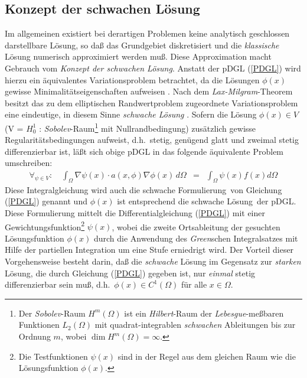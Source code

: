 \subsection{Konzept der schwachen Lösung}
\label{schwacheloesung}

Im allgemeinen existiert bei derartigen Problemen keine analytisch
geschlossen darstellbare Lösung, so daß das Grundgebiet diskretisiert
und die {\em klassische} Lösung numerisch approximiert werden muß. Diese
Approximation macht Gebrauch vom {\em Konzept der schwachen Lösung}.
Anstatt der pDGL (\ref{PDGL}) wird hierzu ein äquivalentes Variationsproblem
betrachtet, da die Lösungen $\phi(x)$ gewisse Minimalitätseigenschaften
aufweisen \cite{Bat82, Zie84}. Nach dem {\sl Lax-Milgram}-Theorem besitzt
das zu dem elliptischen Randwertproblem zugeordnete Variationsproblem eine
eindeutige, in diesem Sinne {\em schwache Lösung} \cite{Bra91}.
Sofern die Lösung
$\phi(x) \in V$ (V = $H_{0}^{1}$ : {\sl Sobolev}-Raum\footnote{Der
{\sl Sobolev}-Raum $H^{m}(\Omega)$ ist ein {\sl Hilbert}-Raum der
{\sl Lebesgue}-meßbaren Funktionen $L_{2}(\Omega)$ mit quadrat-integrablen
{\em schwachen} Ableitungen bis zur Ordnung $m$, wobei
$\dim H^{m}(\Omega) = \infty$.} mit Nullrandbedingung)
zusätzlich gewisse Regularitätsbedingungen
aufweist, d.h.\ stetig, genügend glatt und zweimal stetig differenzierbar
ist,    %
läßt sich obige pDGL in das folgende äquivalente Problem umschreiben:
\begin{eqnarray}
\label{schwach}
  \forall_{\psi \in V}: \quad \int_{\Omega} \nabla\psi(x) \cdot a(x,\phi)
  \nabla \phi(x) \, d\Omega & = & \int_{\Omega} \psi(x) f(x) d\Omega
\end{eqnarray}
Diese Integralgleichung wird auch die \glqq schwache Formulierung\grqq \,
von Gleichung (\ref{PDGL}) genannt und $\phi(x)$ ist entsprechend die
\glqq schwache Lösung\grqq \, der pDGL. Diese Formulierung mittelt die
Differentialgleichung (\ref{PDGL}) mit einer Gewichtungsfunktion\footnote{Die
Testfunktionen $\psi(x)$ sind in der Regel aus dem gleichen Raum wie die
Lösungsfunktion $\phi(x)$.} $\psi(x)$, wobei die zweite Ortsableitung der
gesuchten Lösungsfunktion $\phi(x)$ durch die Anwendung des
{\sl Green}schen Integralsatzes mit Hilfe der partiellen Integration um
eine Stufe erniedrigt wird. Der Vorteil dieser Vorgehensweise besteht
darin, daß die {\em schwache} Lösung im Gegensatz zur {\em starken} Lösung,
die durch Gleichung (\ref{PDGL}) gegeben ist, nur {\em einmal} stetig
differenzierbar sein muß, d.h.\
$\phi(x) \in C^{1}(\Omega)$ für alle $x \in \Omega$.



